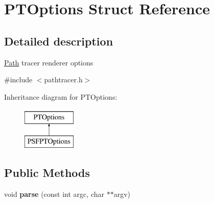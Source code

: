 \hypertarget{struct_p_t_options}{}\section{P\+T\+Options Struct Reference}
\label{struct_p_t_options}


\subsection{Detailed description}
\hyperlink{struct_path}{Path} tracer renderer options 

{\ttfamily \#include $<$pathtracer.\+h$>$}

Inheritance diagram for P\+T\+Options\+:\begin{figure}[H]
\begin{center}
\leavevmode
\includegraphics[height=2.000000cm]{struct_p_t_options}
\end{center}
\end{figure}
\subsection*{Public Methods}
\begin{DoxyCompactItemize}
\item 
\mbox{\label{struct_p_t_options_af420523007f53efa61363c67a13d5628}} 
void {\bfseries parse} (const int argc, char $\ast$$\ast$argv)
\end{DoxyCompactItemize}
